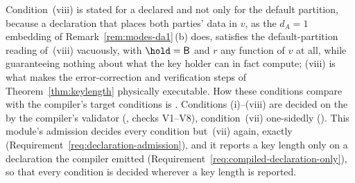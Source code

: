
Condition~(viii) is stated for a declared  and not
only for the default partition, because a declaration that
places both parties' data in $v$, as the $d_A=1$ embedding of
Remark~\ref{rem:modes-da1}\,(b) does, satisfies the default-partition
reading of~(viii) vacuously, with $\hold=\mathsf B$ and $r$ any function of
$v$ at all, while guaranteeing nothing about what the key holder can in
fact compute; (viii) is what makes the error-correction and verification
steps of Theorem~\ref{thm:keylength} physically executable. How these
conditions compare with the compiler's target conditions is
. Conditions (i)--(viii) are
decided on the  by the compiler's validator
(, checks V1--V8), condition~(vii)
one-sidedly (). This module's
admission decides every condition but~(vii) again, exactly
(Requirement~\ref{req:declaration-admission}), and it reports a key length
only on a declaration the compiler emitted
(Requirement~\ref{req:compiled-declaration-only}), so that every condition
is decided wherever a key length is reported.

